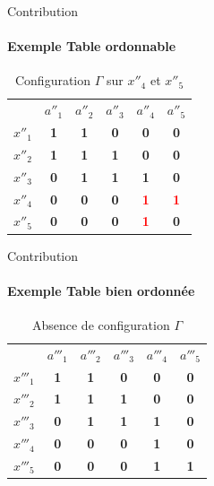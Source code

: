 \documentclass{beamer}
\begin{document}
  \begin{frame}{Contribution}
  \framesubtitle{Exemple Table ordonnable}
	\begin{table}[htb]
	  \centering

	\begin{tabular}{lccccc}
	& $a''_1$ & $a''_2$ & $a''_3$ & $a''_4$ & $a''_5$\\
	$x''_1$ & \textbf{1} & \textbf{1} & \textbf{0} & \textbf{0} & \textbf{0}\\
	$x''_2$ & \textbf{1} & \textbf{1} & \textbf{1} & \textbf{0} & \textbf{0}\\
	$x''_3$ & \textbf{0} & \textbf{1} & \textbf{1} & \textbf{1} & \textbf{0}\\
	$x''_4$ & \textbf{0} & \textbf{0} & \textbf{0} & \textcolor{red}{\textbf{1}} & \textcolor{red}{\textbf{1}}\\
	$x''_5$ & \textbf{0} & \textbf{0} & \textbf{0} & \textcolor{red}{\textbf{1}} & \textbf{0}
	\end{tabular}
  \caption{Configuration $\Gamma$ sur $x''_4$ et $x''_5$ }
	\end{table}
  \end{frame}

  \begin{frame}{Contribution}
  \framesubtitle{Exemple Table bien ordonnée}
	\begin{table}[htb]
	  \centering

	\begin{tabular}{lccccc}
	& $a'''_1$ & $a'''_2$ & $a'''_3$ & $a'''_4$ & $a'''_5$\\
	$x'''_1$ & \textbf{1} & \textbf{1} & \textbf{0} & \textbf{0} & \textbf{0}\\
	$x'''_2$ & \textbf{1} & \textbf{1} & \textbf{1} & \textbf{0} & \textbf{0}\\
	$x'''_3$ & \textbf{0} & \textbf{1} & \textbf{1} & \textbf{1} & \textbf{0}\\
	$x'''_4$ & \textbf{0} & \textbf{0} & \textbf{0} & \textbf{1} & \textbf{0}\\
	$x'''_5$ & \textbf{0} & \textbf{0} & \textbf{0} & \textbf{1} & \textbf{1}
	\end{tabular}
   \caption{Absence de configuration $\Gamma$}
	\end{table}
  \end{frame}
\end{document}
